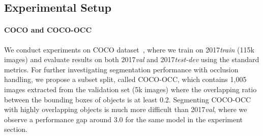 \subsection{Experimental Setup}

\paragraph{COCO and COCO-OCC}
We conduct experiments on COCO dataset~\cite{lin2014microsoft}, where we train on 2017{\it train} (115k images) and evaluate results on both 2017{\it val} and 2017{\it test-dev} using the standard metrics. For further investigating segmentation performance with occlusion handling, we propose a subset split, called COCO-OCC, which contains 1,005 images extracted from the validation set (5k images) where the overlapping ratio between the bounding boxes of objects is at least 0.2. Segmenting COCO-OCC with highly overlapping objects is much more difficult than 2017{\it val}, where we observe a performance gap around 3.0 for the same model in the experiment section. 


